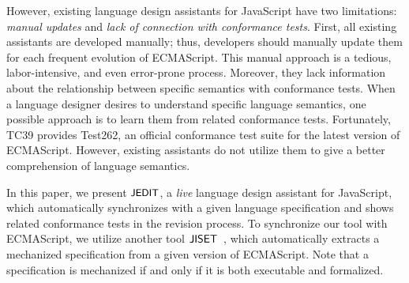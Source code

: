 However, existing language design assistants for JavaScript have two
limitations: \textit{manual updates} and \textit{lack of connection with
conformance tests}. First, all existing assistants are developed manually; thus,
developers should manually update them for each frequent evolution of
ECMAScript. This manual approach is a tedious, labor-intensive, and even
error-prone process. Moreover, they lack information about the relationship
between specific semantics with conformance tests. When a language designer
desires to understand specific language semantics, one possible approach is to
learn them from related conformance tests. Fortunately, TC39 provides Test262,
an official conformance test suite for the latest version of ECMAScript.
However, existing assistants do not utilize them to give a better comprehension
of language semantics.

In this paper, we present $\textsf{\small JEDIT}$, a \textit{live} language design assistant for
JavaScript, which automatically synchronizes with a given language specification
and shows related conformance tests in the revision process. To synchronize our
tool with ECMAScript, we utilize another tool $\textsf{JISET}$~\cite{jiset}, which
automatically extracts a mechanized specification from a given version of
ECMAScript. Note that a specification is mechanized if and only if it is both
executable and formalized.
\todo
